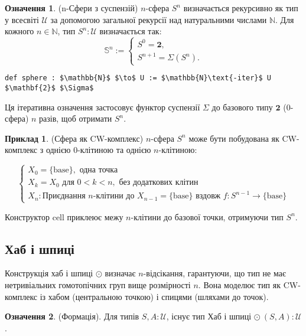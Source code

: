\documentclass{article}
\theoremstyle{definition}
\newtheorem{definition}{Означення}
\newtheorem{example}{Приклад}
\begin{document}
\begin{definition} (n-Сфери з суспензій)
\( n \)-сфера \( S^n \) визначається рекурсивно як тип у
всесвіті \( \mathcal{U} \) за допомогою загальної рекурсії над натуральними
числами \( \mathbb{N} \). Для кожного \( n \in \mathbb{N} \),
тип \( S^n : \mathcal{U} \) визначається так:
\[
\mathbb{S}^n :=
\begin{cases}
S^0 = \mathbf{2}, \\
S^{n+1} = \Sigma(S^n).
\end{cases}
\]
\begin{lstlisting}[mathescape=true]
def sphere : $\mathbb{N}$ $\to$ U := $\mathbb{N}\text{-iter}$ U $\mathbf{2}$ $\Sigma$
\end{lstlisting}
Ця ітеративна означення застосовує функтор суспензії \( \Sigma \)
до базового типу \( \mathbf{2} \) (0-сфера) \( n \) разів, щоб отримати \( S^n \).
\end{definition}

\begin{example} (Сфера як CW-комплекс)
\( n \)-сфера \( S^n \) може бути побудована як CW-комплекс з
однією 0-клітиною та однією \( n \)-клітиною:

\[
\begin{cases}
X_0 = \{ \text{base} \}, \text{ одна точка} \\
X_k = X_0 \text{ для } 0 < k < n, \text{ без додаткових клітин} \\
X_n: \text{Приєднання } n\text{-клітини до } X_{n-1} = \{ \text{base} \} \text{ вздовж } f : S^{n-1} \to \{ \text{base} \}
\end{cases}
\]

Конструктор \( \text{cell} \) приклеює межу \( n \)-клітини
до базової точки, отримуючи тип \( S^n \).
\end{example}

\newpage
\subsection{Хаб і шпиці}
Конструкція хаб і шпиці \( \odot \) визначає \( n \)-відсікання,
гарантуючи, що тип не має нетривіальних гомотопічних груп вище
розмірності \( n \). Вона моделює тип як CW-комплекс із
хабом (центральною точкою) і спицями (шляхами до точок).

\begin{definition} (Формація).
Для типів \( S, A : \mathcal{U} \), існує тип Хаб і шпиці \( \odot\ (S,A) : \mathcal{U} \).
\end{definition}
\end{document}
